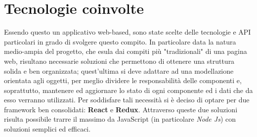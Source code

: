 \section{Tecnologie coinvolte}
Essendo questo un applicativo web-based, sono state scelte delle tecnologie e API particolari in grado di svolgere questo compito.\newline
In particolare data la natura medio-ampia del progetto, che esula dai compiti più "tradizionali" di una pagina web, risultano necessarie soluzioni che permettono di ottenere una struttura solida e ben organizzata; quest'ultima si deve adattare ad una modellazione orientata agli oggetti, per meglio dividere le responsabilità delle componenti e, soprattutto, mantenere ed aggiornare lo stato di ogni componente ed i dati che da esso verranno utilizzati.\newline
Per soddisfare tali necessità si è deciso di optare per due framework ben consolidati: {\bf React} e {\bf Redux}.\newline
Attraverso queste due soluzioni risulta possibile trarre il massimo da JavaScript (in particolare \emph{Node Js}) con soluzioni semplici ed efficaci.
